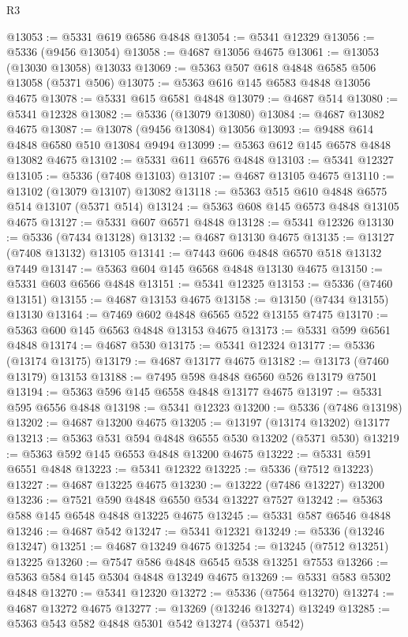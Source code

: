 \begin{lexlean}{R3}
\begin{coremodule}
@13053 := @5331 @619 @6586 @4848
@13054 := @5341 @12329
@13056 := @5336 (@9456 @13054)
@13058 := @4687 @13056 @4675
@13061 := @13053 (@13030 @13058) @13033
@13069 := @5363 @507 @618 @4848 @6585 @506 @13058 (@5371 @506)
@13075 := @5363 @616 @145 @6583 @4848 @13056 @4675
@13078 := @5331 @615 @6581 @4848
@13079 := @4687 @514
@13080 := @5341 @12328
@13082 := @5336 (@13079 @13080)
@13084 := @4687 @13082 @4675
@13087 := @13078 (@9456 @13084) @13056
@13093 := @9488 @614 @4848 @6580 @510 @13084 @9494
@13099 := @5363 @612 @145 @6578 @4848 @13082 @4675
@13102 := @5331 @611 @6576 @4848
@13103 := @5341 @12327
@13105 := @5336 (@7408 @13103)
@13107 := @4687 @13105 @4675
@13110 := @13102 (@13079 @13107) @13082
@13118 := @5363 @515 @610 @4848 @6575 @514 @13107 (@5371 @514)
@13124 := @5363 @608 @145 @6573 @4848 @13105 @4675
@13127 := @5331 @607 @6571 @4848
@13128 := @5341 @12326
@13130 := @5336 (@7434 @13128)
@13132 := @4687 @13130 @4675
@13135 := @13127 (@7408 @13132) @13105
@13141 := @7443 @606 @4848 @6570 @518 @13132 @7449
@13147 := @5363 @604 @145 @6568 @4848 @13130 @4675
@13150 := @5331 @603 @6566 @4848
@13151 := @5341 @12325
@13153 := @5336 (@7460 @13151)
@13155 := @4687 @13153 @4675
@13158 := @13150 (@7434 @13155) @13130
@13164 := @7469 @602 @4848 @6565 @522 @13155 @7475
@13170 := @5363 @600 @145 @6563 @4848 @13153 @4675
@13173 := @5331 @599 @6561 @4848
@13174 := @4687 @530
@13175 := @5341 @12324
@13177 := @5336 (@13174 @13175)
@13179 := @4687 @13177 @4675
@13182 := @13173 (@7460 @13179) @13153
@13188 := @7495 @598 @4848 @6560 @526 @13179 @7501
@13194 := @5363 @596 @145 @6558 @4848 @13177 @4675
@13197 := @5331 @595 @6556 @4848
@13198 := @5341 @12323
@13200 := @5336 (@7486 @13198)
@13202 := @4687 @13200 @4675
@13205 := @13197 (@13174 @13202) @13177
@13213 := @5363 @531 @594 @4848 @6555 @530 @13202 (@5371 @530)
@13219 := @5363 @592 @145 @6553 @4848 @13200 @4675
@13222 := @5331 @591 @6551 @4848
@13223 := @5341 @12322
@13225 := @5336 (@7512 @13223)
@13227 := @4687 @13225 @4675
@13230 := @13222 (@7486 @13227) @13200
@13236 := @7521 @590 @4848 @6550 @534 @13227 @7527
@13242 := @5363 @588 @145 @6548 @4848 @13225 @4675
@13245 := @5331 @587 @6546 @4848
@13246 := @4687 @542
@13247 := @5341 @12321
@13249 := @5336 (@13246 @13247)
@13251 := @4687 @13249 @4675
@13254 := @13245 (@7512 @13251) @13225
@13260 := @7547 @586 @4848 @6545 @538 @13251 @7553
@13266 := @5363 @584 @145 @5304 @4848 @13249 @4675
@13269 := @5331 @583 @5302 @4848
@13270 := @5341 @12320
@13272 := @5336 (@7564 @13270)
@13274 := @4687 @13272 @4675
@13277 := @13269 (@13246 @13274) @13249
@13285 := @5363 @543 @582 @4848 @5301 @542 @13274 (@5371 @542)

\end{coremodule}
\end{lexlean}
